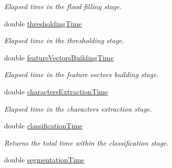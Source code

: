 \begin{CompactItemize}
\begin{CompactList}\small\item\em Elapsed time in the flood filling stage. \item\end{CompactList}\item 
\hypertarget{struct_statistics_e2c88c8b599b217ad3f316cca7a15a23}{
double \hyperlink{struct_statistics_e2c88c8b599b217ad3f316cca7a15a23}{thresholdingTime}}
\label{struct_statistics_e2c88c8b599b217ad3f316cca7a15a23}

\begin{CompactList}\small\item\em Elapsed time in the thresholding stage. \item\end{CompactList}\item 
\hypertarget{struct_statistics_ae46d5f7b2a374dd79b15533facc9e6c}{
double \hyperlink{struct_statistics_ae46d5f7b2a374dd79b15533facc9e6c}{featureVectorsBuildingTime}}
\label{struct_statistics_ae46d5f7b2a374dd79b15533facc9e6c}

\begin{CompactList}\small\item\em Elapsed time in the feature vectors building stage. \item\end{CompactList}\item 
\hypertarget{struct_statistics_1e09de36cf3a65ab2a471e877578257d}{
double \hyperlink{struct_statistics_1e09de36cf3a65ab2a471e877578257d}{charactersExtractionTime}}
\label{struct_statistics_1e09de36cf3a65ab2a471e877578257d}

\begin{CompactList}\small\item\em Elapsed time in the characters extraction stage. \item\end{CompactList}\item 
\hypertarget{struct_statistics_7bfcefbca86812a13371f35f6ad2632c}{
double \hyperlink{struct_statistics_7bfcefbca86812a13371f35f6ad2632c}{classificationTime}}
\label{struct_statistics_7bfcefbca86812a13371f35f6ad2632c}

\begin{CompactList}\small\item\em Returns the total time within the classification stage. \item\end{CompactList}\item 
\hypertarget{struct_statistics_f5afa8bf14678df2d5b869b6161a209f}{
double \hyperlink{struct_statistics_f5afa8bf14678df2d5b869b6161a209f}{segmentationTime}}
\label{struct_statistics_f5afa8bf14678df2d5b869b6161a209f}


\end{CompactItemize}
